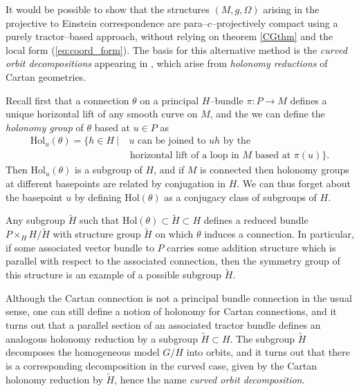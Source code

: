 It would be possible to show that the structures $(M,g,\Omega)$ arising in the projective to Einstein correspondence are para--$c$--projectively compact using a purely tractor--based approach, without relying on theorem \ref{CGthm} and the local form (\ref{eq:coord_form}). The basis for this alternative method is the \textit{curved orbit decompositions} appearing in \cite{CGH-duke}, which arise from \textit{holonomy reductions} of Cartan geometries.

Recall first that a connection $\theta$ on a principal $H$--bundle $\pi:P\rightarrow M$ defines a unique horizontal lift of any smooth curve on $M$, and the we can define the \textit{holonomy group} of $\theta$ based at $u\in P$ as
\begin{align*}
\mathrm{Hol}_u(\theta)=\{h\in H\ |&\ u\mbox{ can be joined to }uh\mbox{ by the}\\
&\mbox{ horizontal lift of a loop in }M\mbox{ based at }\pi(u)\}.
\end{align*}
Then $\mathrm{Hol}_u(\theta)$ is a subgroup of $H$, and if $M$ is connected then holonomy groups at different basepoints are related by conjugation in $H$. We can thus forget about the basepoint $u$ by defining $\mathrm{Hol}(\theta)$ as a conjugacy class of subgroups of $H$.

Any subgroup $\tilde{H}$ such that $\mathrm{Hol}(\theta)\subset \tilde{H}\subset H$ defines a reduced bundle $P\times_H H/\tilde{H}$ with structure group $\tilde{H}$ on which $\theta$ induces a connection. In particular, if some associated vector bundle to $P$ carries some addition structure which is parallel with respect to the associated connection, then the symmetry group of this structure is an example of a possible subgroup $\tilde{H}$.

Although the Cartan connection is not a principal bundle connection in the usual sense, one can still define a notion of holonomy for Cartan connections, and it turns out \cite{CGH-duke} that a parallel section of an associated tractor bundle defines an analogous holonomy reduction by a subgroup $\tilde{H}\subset H$. The subgroup $\tilde{H}$ decomposes the homogeneous model $G/H$ into orbits, and it turns out that there is a corresponding decomposition in the curved case, given by the Cartan holonomy reduction by $\tilde{H}$, hence the name \textit{curved orbit decomposition}. 

